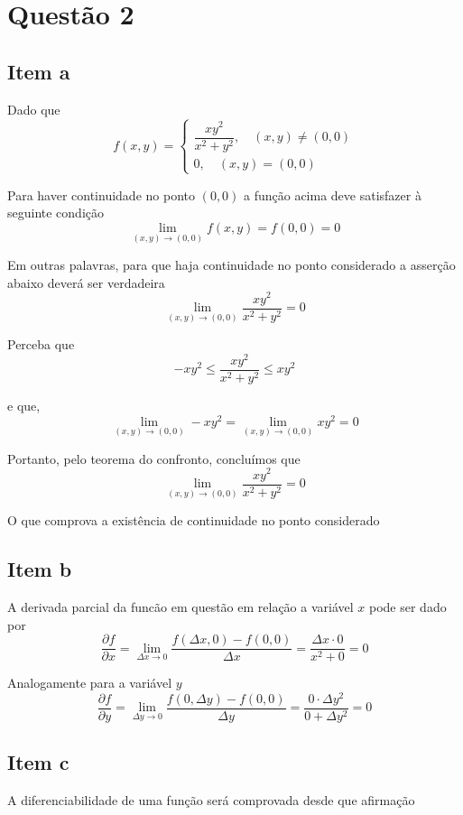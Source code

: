 \documentclass[
	article,			%
	11pt,				%
	oneside,			%
	a4paper,			%
	english,			%
	brazil,				%
	sumario=tradicional
	]{abntex2}
\begin{document}
	\section*{Questão 2}

	\subsection*{Item a}
	Dado que
	$$f\left( x,y\right) =\begin{cases} \dfrac {xy^{2}} {x^{2}+y^{2}}, \quad \left( x,y\right) \neq \left( 0,0\right) \\ 0, \quad \left( x,y\right) =\left( 0,0\right) \end{cases} $$

	Para haver continuidade no ponto $\left( 0,0\right)$ a função acima deve satisfazer à seguinte condição
	$$\lim_{(x,y)\to(0,0) } f(x,y) = f(0,0) = 0$$

	Em outras palavras, para que haja continuidade no ponto considerado a asserção abaixo deverá ser verdadeira
	$$\lim_{(x,y)\to(0,0) } \dfrac {xy^{2}} {x^{2}+y^{2}} = 0$$

	Perceba que
	$$ -xy^{2} \leq \dfrac {xy^{2}} {x^{2}+y^{2}}\leq xy^{2}$$

	e que,
	$$ \lim_{(x,y)\to(0,0) } -xy^{2} = \lim_{(x,y)\to(0,0) } xy^{2} = 0  $$

	Portanto, pelo teorema do confronto, concluímos que
	$$\lim_{(x,y)\to(0,0) } \dfrac {xy^{2}} {x^{2}+y^{2}} = 0$$

	O que comprova a existência de continuidade no ponto considerado

	\subsection*{Item b}
	A derivada parcial da funcão em questão em relação a variável $x$ pode ser dado por
	$$\dfrac {\partial f} {\partial x} = \lim_{\Delta x \to 0 } \dfrac {f(\Delta x, 0 ) - f(0 , 0)}{\Delta x} = \dfrac {\Delta x \cdot 0} {x^2+0} = 0$$

	Analogamente para a variável $y$
	$$\dfrac {\partial f} {\partial y} = \lim_{\Delta y\to 0 } \dfrac {f(0 , \Delta y) - f(0 , 0)}{\Delta y} = \dfrac {0 \cdot \Delta y^2} {0+ \Delta y^2} = 0$$

	\subsection*{Item c}
	A diferenciabilidade de uma função será comprovada desde que afirmação
\end{document}
